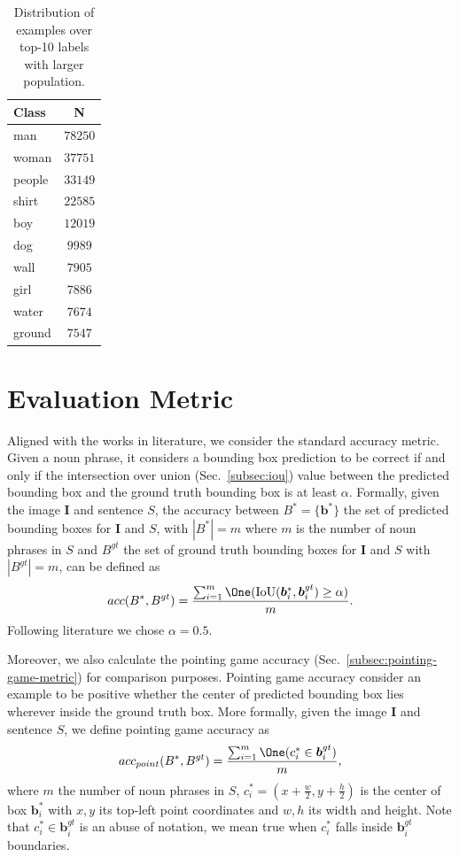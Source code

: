\begin{table}
  \centering
  \begin{tabular}{lc}
    Class  & N       \\\hline
    man    & $78250$ \\
    woman  & $37751$ \\
    people & $33149$ \\
    shirt  & $22585$ \\
    boy    & $12019$ \\
    dog    & $9989$  \\
    wall   & $7905$  \\
    girl   & $7886$  \\
    water  & $7674$  \\
    ground & $7547$  \\
  \end{tabular}
  \caption{Distribution of examples over top-10 labels with larger population.}
  \label{tab:flickr30k-label-data-top10}
\end{table}

\section{Evaluation Metric}
\label{sec:evaluation-metric}

Aligned with the works in literature, we consider the standard
accuracy metric. Given a noun phrase, it considers a bounding box
prediction to be correct if and only if the intersection over union
(Sec.~\ref{subsec:iou}) value between the predicted bounding box and
the ground truth bounding box is at least $\alpha$. Formally, given
the image $\bm{I}$ and sentence $S$, the accuracy between $B^* = \{
\bm{b}^* \}$ the set of predicted bounding boxes for $\bm{I}$ and $S$,
with $|B^*| = m$ where $m$ is the number of noun phrases in $S$ and
$B^{gt}$ the set of ground truth bounding boxes for $\bm{I}$ and $S$
with $|B^{gt}| = m$, can be defined as
\[
  acc(B^*, B^{gt}) = \frac{\sum_{i = 1}^{m} \One (\iou (\bm{b}_i^*, \bm{b}_i^{gt}) \geq \alpha)}{m}.
\]
Following literature we chose $\alpha = 0.5$.

Moreover, we also calculate the pointing game accuracy
(Sec.~\ref{subsec:pointing-game-metric}) for comparison purposes.
Pointing game accuracy consider an example to be positive whether the
center of predicted bounding box lies wherever inside the ground truth
box. More formally, given the image $\bm{I}$ and sentence $S$, we
define pointing game accuracy as 
\[
  acc_{point}(B^*, B^{gt}) = \frac{\sum_{i = 1}^{m} \One (c_i^* \in  \bm{b}_i^{gt})}{m},
\]
where $m$ the number of noun phrases in $S$, $c^*_i = (x +
\frac{w}{2}, y + \frac{h}{2})$ is the center of box $\bm{b}^*_i$ with
$x, y$ its top-left point coordinates and $w, h$ its width and height.
Note that $c^*_i \in \bm{b}^{gt}_i$ is an abuse of notation, we mean true
when $c^*_i$ falls inside $\bm{b}^{gt}_i$ boundaries.

